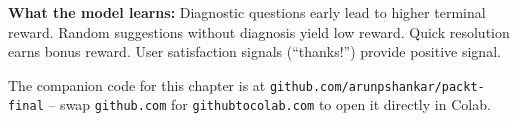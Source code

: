 \begin{chapterenv}
\textbf{What the model learns:} Diagnostic questions early lead to higher terminal reward. Random suggestions without diagnosis yield low reward. Quick resolution earns bonus reward. User satisfaction signals (``thanks!'') provide positive signal.


The companion code for this chapter is at \texttt{github.com/arunpshankar/packt-final} -- swap \texttt{github.com} for \texttt{githubtocolab.com} to open it directly in Colab.

\end{chapterenv}